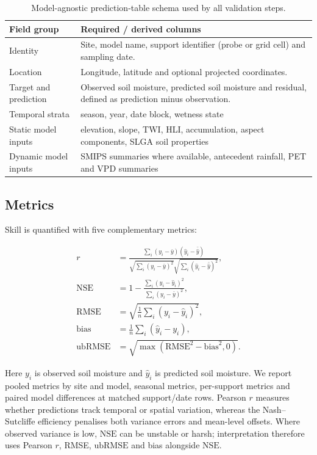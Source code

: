 \documentclass[11pt,a4paper]{article}
\newcommand{\nse}{\ensuremath{\mathrm{NSE}}}
\newcommand{\ubrmse}{\ensuremath{\mathrm{ubRMSE}}}
\newcommand{\pearsonr}{\ensuremath{r}}
\begin{document}
\begin{table}[htbp]
\centering
\small
\caption{Model-agnostic prediction-table schema used by all validation steps.}
\label{tab:prediction-schema}
\begin{tabularx}{\textwidth}{>{\raggedright\arraybackslash}p{3.2cm}
                              >{\raggedright\arraybackslash}X}
\toprule
Field group & Required / derived columns \\
\midrule
Identity & Site, model name, support identifier (probe or grid cell) and
sampling date. \\
Location & Longitude, latitude and optional projected coordinates. \\
Target and prediction & Observed soil moisture, predicted soil moisture and
residual, defined as prediction minus observation. \\
Temporal strata & season, year, date block, wetness state \\
Static model inputs & elevation, slope, TWI, HLI, accumulation, aspect
components, SLGA soil properties \\
Dynamic model inputs & SMIPS summaries where available, antecedent rainfall,
PET and VPD summaries \\
\bottomrule
\end{tabularx}
\end{table}

\subsection{Metrics}\label{sec:metrics}

Skill is quantified with five complementary metrics:

\begin{align}
\pearsonr &= \frac{\sum_i (y_i - \bar{y})(\hat{y}_i - \bar{\hat{y}})}
  {\sqrt{\sum_i (y_i - \bar{y})^2}\sqrt{\sum_i(\hat{y}_i - \bar{\hat{y}})^2}}, \\
\nse &= 1 - \frac{\sum_i (y_i - \hat{y}_i)^2}
               {\sum_i (y_i - \bar{y})^2}, \\
\mathrm{RMSE} &= \sqrt{\frac{1}{n}\sum_i (y_i - \hat{y}_i)^2}, \\
\mathrm{bias} &= \frac{1}{n}\sum_i(\hat{y}_i - y_i), \\
\ubrmse &= \sqrt{\max(\mathrm{RMSE}^2 - \mathrm{bias}^2, 0)}.
\end{align}

Here $y_i$ is observed soil moisture and $\hat{y}_i$ is predicted soil
moisture.  We report pooled metrics by site and model, seasonal metrics,
per-support metrics and paired model differences at matched support/date rows.
Pearson $\pearsonr$ measures whether predictions track temporal or spatial
variation, whereas the Nash--Sutcliffe efficiency \citep[\nse;][]{nash1970river}
penalises both variance errors and mean-level offsets.  Where observed variance
is low, \nse{} can be unstable or harsh; interpretation therefore uses Pearson
$\pearsonr$, RMSE, \ubrmse{} and bias alongside \nse{}.
\end{document}
